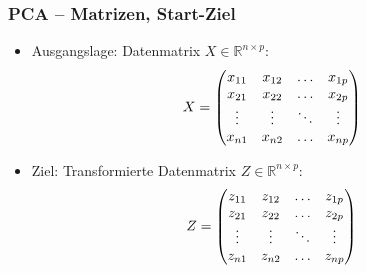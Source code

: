 
\begin{frame}

\frametitle{PCA -- Matrizen, Start-Ziel}

\begin{itemize}
\setlength{\itemsep}{20pt}
\item Ausgangslage: Datenmatrix $X \in \mathbb{R}^{n \times p}$:
\begin{equation}
X=\begin{pmatrix}
x_{11} & x_{12} & \hdots & x_{1p} \\
x_{21} & x_{22} & \hdots & x_{2p} \\
\vdots & \vdots & \ddots & \vdots \\
x_{n1} & x_{n2} & \hdots & x_{np}
\end{pmatrix} \notag
\end{equation}
\item Ziel: Transformierte Datenmatrix $Z \in \mathbb{R}^{n \times p}$:
\begin{equation}
Z=\begin{pmatrix}
z_{11} & z_{12} & \hdots & z_{1p} \\
z_{21} & z_{22} & \hdots & z_{2p} \\
\vdots & \vdots & \ddots & \vdots \\
z_{n1} & z_{n2} & \hdots & z_{np}
\end{pmatrix} \notag
\end{equation}
\end{itemize}
\end{frame}











